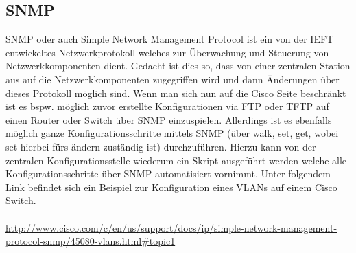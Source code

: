 \documentclass[a4paper,12pt]{scrreprt}
\begin{document}
\subsection{SNMP}
SNMP oder auch Simple Network Management Protocol ist ein von der IEFT entwickeltes Netzwerkprotokoll welches zur Überwachung und Steuerung von Netzwerkkomponenten dient. Gedacht ist dies so, dass von einer zentralen Station aus auf die Netzwerkkomponenten zugegriffen wird und dann Änderungen über dieses Protokoll möglich sind. Wenn man sich nun auf die Cisco Seite beschränkt ist es bspw. möglich zuvor erstellte Konfigurationen via FTP oder TFTP auf einen Router oder Switch über SNMP einzuspielen. Allerdings ist es ebenfalls möglich ganze Konfigurationsschritte mittels SNMP (über walk, set, get, wobei set hierbei fürs ändern zuständig ist) durchzuführen. Hierzu kann von der zentralen Konfigurationsstelle wiederum ein Skript ausgeführt werden welche alle Konfigurationsschritte über SNMP automatisiert vornimmt. Unter folgendem Link befindet sich ein Beispiel zur Konfiguration eines VLANs auf einem Cisco Switch.\\\\ \hyperref[Link im Literaturverzeichnis]{http://www.cisco.com/c/en/us/support/docs/ip/simple-network-management-protocol-snmp/45080-vlans.html\#topic1}\cite{snmp}

\end{document}

